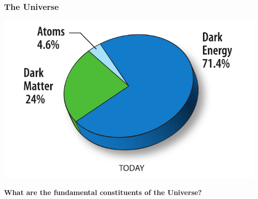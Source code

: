\documentclass{beamer}
\begin{document}
\begin{frame}
\begin{minipage}[b]{0.95\paperwidth}
\begin{columns}
\begin{column}{0.45\paperwidth}
      \end{column}      
     \end{columns}   
 \end{minipage}
 
\end{frame}

\begin{frame}
\frametitle{\Huge{The Universe}}
 \begin{minipage}[t]{\paperwidth}
    \includegraphics[height=0.60\paperwidth,width=0.85\paperwidth]{THESISPLOTS/WMAPUniversePie.pdf}    
 \end{minipage}
  \vspace{-0.09cm}
 \textcolor{UMN@Maroon}{\textbf{What are the fundamental constituents of the Universe?}}
\end{frame}
\end{document}
